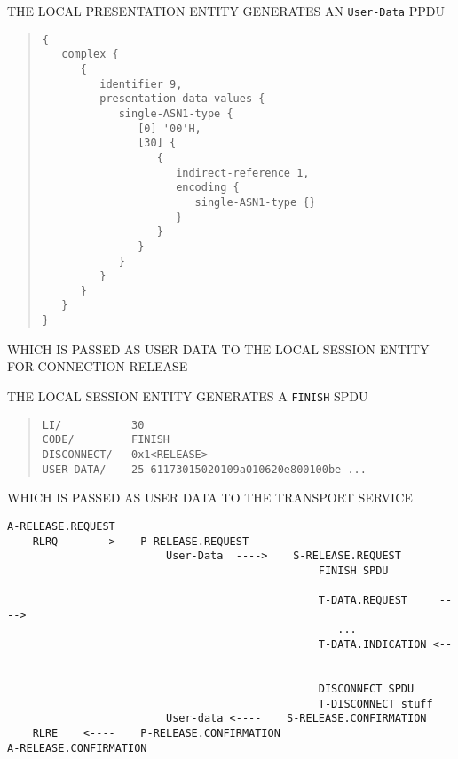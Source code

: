 \begin{bwslide}

\begin{nrtc}
\item	THE LOCAL PRESENTATION ENTITY GENERATES AN \verb"User-Data" PPDU
\begin{quote}\small\begin{verbatim}
{
   complex {
      {
         identifier 9,
         presentation-data-values {
            single-ASN1-type {
               [0] '00'H,
               [30] {
                  {
                     indirect-reference 1,
                     encoding {
                        single-ASN1-type {}
                     }
                  }
               }
            }
         }
      }
   }
}
\end{verbatim}\end{quote}

\item	WHICH IS PASSED AS USER DATA TO THE LOCAL SESSION ENTITY FOR
	CONNECTION RELEASE
\end{nrtc}
\end{bwslide}


\begin{bwslide}

\begin{nrtc}
\item	THE LOCAL SESSION ENTITY GENERATES A \verb"FINISH" SPDU
\begin{quote}\small\begin{verbatim}
LI/           30
CODE/         FINISH
DISCONNECT/   0x1<RELEASE>
USER DATA/    25 61173015020109a010620e800100be ...
\end{verbatim}\end{quote}

\item	WHICH IS PASSED AS USER DATA TO THE TRANSPORT SERVICE
\end{nrtc}
\end{bwslide}


\begin{bwslide}

\scriptsize
\begin{verbatim}
A-RELEASE.REQUEST
    RLRQ    ---->    P-RELEASE.REQUEST
                         User-Data  ---->    S-RELEASE.REQUEST
                                                 FINISH SPDU

                                                 T-DATA.REQUEST     ---->
                                                    ...
                                                 T-DATA.INDICATION <----

                                                 DISCONNECT SPDU
                                                 T-DISCONNECT stuff
                         User-data <----    S-RELEASE.CONFIRMATION
    RLRE    <----    P-RELEASE.CONFIRMATION
A-RELEASE.CONFIRMATION
\end{verbatim}
\end{bwslide}
